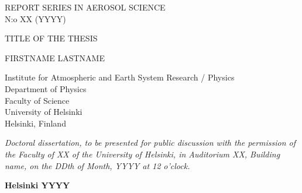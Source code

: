 \documentclass[a4paper,12pt]{article}
\begin{document}
\pagestyle{empty}

\begin{center}
REPORT SERIES IN AEROSOL SCIENCE \\

N:o XX (YYYY) \\

\vspace*{3cm}

{\Large TITLE OF THE THESIS
\\
}

\vspace*{2cm}

{\large
FIRSTNAME LASTNAME \\
}

\vspace*{2cm}
Institute for Atmospheric and Earth System Research / Physics\\
Department of Physics \\
Faculty of Science \\
University of Helsinki \\
Helsinki, Finland

\vspace*{2cm}

{\em Doctoral dissertation, to be presented for public discussion with the permission of the Faculty of XX
of the University of Helsinki, in Auditorium XX, Building name, on the DDth of Month, YYYY at 12 o’clock.}

\vspace*{1cm}

{\bf Helsinki YYYY}

\newpage
\vspace*{-2.2cm}


\end{center}
\end{document}
